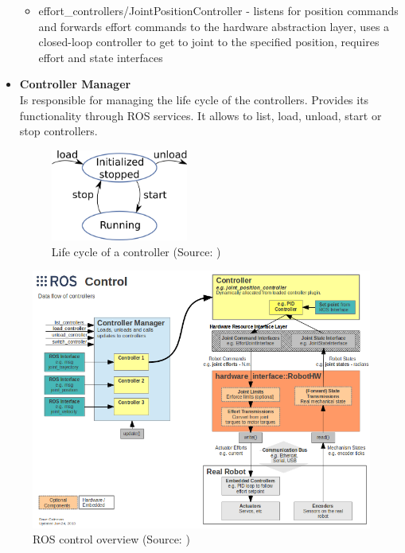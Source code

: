 \documentclass[english,inz,shortabstract]{iithesis}
\begin{document}
\begin{itemize}
\begin{itemize}
                \item \textsf{effort\_controllers/JointPositionController} - listens for position commands and forwards effort commands to the hardware abstraction layer, uses a closed-loop controller to get to joint to the specified position, requires effort and state interfaces
            \end{itemize}
        \item \textbf{Controller Manager}\\
        Is responsible for managing the life cycle of the controllers. Provides its functionality through ROS services. It allows to list, load, unload, start or stop controllers. 
        \begin{figure}[ht]
            \centering
            \includegraphics[height=3cm]{img/controller_life.png}
            \caption{Life cycle of a controller (Source: \cite{ros_control:cm_wiki})}
            \label{fig:controller_life}
        \end{figure}

    \end{itemize}

    
    \begin{figure}[ht]
        \centering
        \includegraphics[width=\textwidth]{img/ros_control.png}
        \caption{ROS control overview (Source: \cite{ros_control:wiki})}
        \label{fig:ros_control}
    \end{figure}
\end{document}
